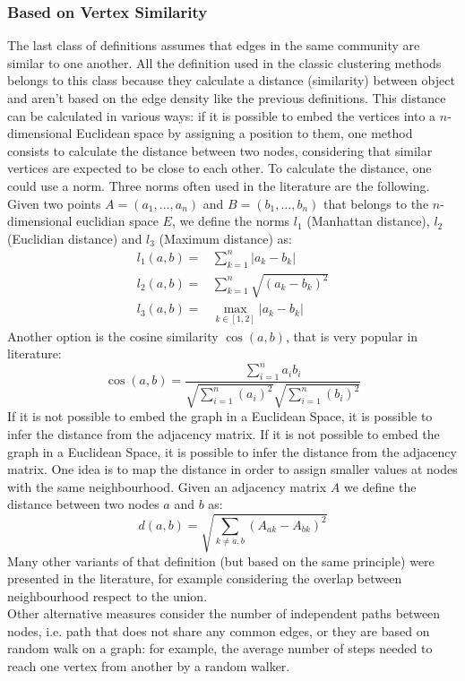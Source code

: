 \subsubsection{Based on Vertex Similarity}
The last class of definitions assumes that edges in the same community are similar to one another. All the definition used in the classic clustering methods belongs to this class because they calculate a distance (similarity) between object and aren't based on the edge density like the previous definitions. This distance can be calculated in various ways:  if it is possible to embed the vertices into a $n$-dimensional Euclidean space by assigning a position to them, one method consists to calculate the distance between two nodes, considering that similar vertices are expected to be close to each other. To calculate the distance, one could use a norm. Three norms often used in the literature are the following. Given two points $A=(a_1, ... , a_n)$ and $B=(b_1, ... , b_n)$ that belongs to the $n$-dimensional euclidian space $E$, we define the norms $l_1$ (Manhattan distance), $l_2$ (Euclidian distance) and $l_3$ (Maximum distance) as:
\begin{align}
l_1(a,b) =&\sum_{k=1}^{n} |a_k - b_k|\\
l_2(a,b) =&\sum_{k=1}^{n} \sqrt{(a_k -b_k)^2}\\
l_3(a,b) =&\max_{k \in [1,2]} |a_k - b_k|
\end{align}
Another option is the cosine similarity $\cos(a, b)$, that is very popular in literature:
\begin{equation}
\cos (a,b) = \frac{ \sum_{i=1}^{n}{{a}_i{b}_i} }{ \sqrt{\sum_{i=1}^{n}{({a}_i)^2}} \sqrt{\sum_{i=1}^{n}{({b}_i)^2}} }
\end{equation}
If it is not possible to embed the graph in a Euclidean Space, it is possible to infer the distance from the adjacency matrix. 
If it is not possible to embed the graph in a Euclidean Space, it is possible to infer the distance from the adjacency matrix. One idea is to map the distance in order to assign smaller values at nodes with the same neighbourhood. Given an adjacency matrix $A$ we define the distance between two nodes $a$ and $b$ as:
\begin{equation}
d(a,b) = \sqrt{\sum_{k\ne a,b} (A_{ak} - A_{bk})^2} 
\end{equation}
Many other variants of that definition (but based on the same principle) were presented in the literature, for example considering the overlap between neighbourhood respect to the union. \\
Other alternative measures consider the number of independent paths between nodes, i.e. path that does not share any common edges, or they are based on random walk on a graph: for example, the average number of steps needed to reach one vertex from another by a random walker.  


